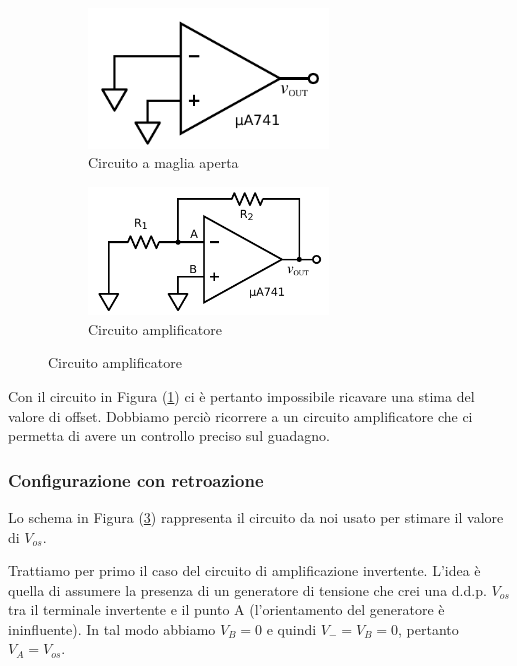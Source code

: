 \begin{figure}[ht]
        \centering
	\caption{}
        \begin{subfigure}[b]{0.35\textwidth}
                 \includegraphics[width=0.70\textwidth]{../E02/latex/open_loop.pdf}
                \caption{Circuito a maglia aperta}
                \label{cir:open_loop}
        \end{subfigure}%
    \quad
        \begin{subfigure}[b]{0.35\textwidth}
               \includegraphics[width=0.70\textwidth]{../E02/latex/inv.pdf}
                \caption{Circuito amplificatore}
                \label{cir:inv}
        \end{subfigure}
\end{figure}

Con il circuito in Figura (\ref{cir:open_loop}) ci è pertanto impossibile ricavare una stima del valore di offset.
Dobbiamo perciò ricorrere a un circuito amplificatore che ci permetta di avere un controllo preciso sul guadagno.

\subsubsection{Configurazione con retroazione}

Lo schema in Figura (\ref{cir:inv}) rappresenta il circuito da noi usato per stimare il valore di $V_{os}$.

Trattiamo per primo il caso del circuito di amplificazione invertente.
L'idea è quella di assumere la presenza di un generatore di tensione che crei una d.d.p. $V_{os}$ tra il terminale invertente e il punto A (l'orientamento del generatore è ininfluente).
In tal modo abbiamo $V_B=0$ e quindi $V_-=V_B=0$, pertanto $V_A = V_{os}$.

